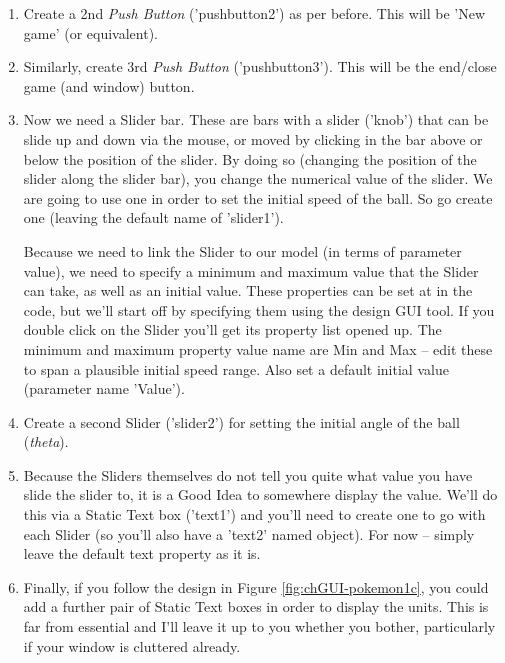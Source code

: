 \documentclass{tufte-book} %
\begin{document}
\begin{enumerate}
\item Create a 2nd \textit{Push Button} ('\textsf{pushbutton}2') as per before. This will be 'New game' (or equivalent).

\item Similarly, create 3rd \textit{Push Button} ('\textsf{pushbutton}3').
This will be the end/close game (and window) button.
\item Now we need a \textsf{Slider} bar. These are bars with a slider ('knob') that can be slide up and down via the mouse, or moved by clicking in the bar above or below the position of the slider. By doing so (changing the position of the slider along the slider bar), you change the numerical value of the slider. We are going to use one in order to set the initial speed of the ball. So go create one (leaving the default name of '\textsf{slider1}').

Because we need to link the \textsf{Slider} to our model (in terms of parameter value), we need to specify a minimum and maximum value that the \textsf{Slider} can take, as well as an initial value. These properties can be set at in the code, but we'll start off by specifying them using the design GUI tool. If you double click on the \textsf{Slider} you'll get its property list opened up. The minimum and maximum property value name are \textsf{Min} and \textsf{Max} -- edit these to span a plausible initial speed range. Also set a default initial value (parameter name '\textsf{Value}').

\item Create a second \textsf{Slider} ('\textsf{slider2}') for setting the initial angle of the ball (\textit{theta}).

\item Because the \textsf{Sliders} themselves do not tell you quite what value you have slide the slider to, it is a Good Idea to somewhere display the value. We'll do this via a \textsf{Static Text} box ('\textsf{text1}') and you'll need to create one to go with each \textsf{Slider} (so you'll also have a '\textsf{text2}' named object). For now -- simply leave the default text property as it is.

\item Finally, if you follow the design in Figure \ref{fig:chGUI-pokemon1c}, you could add a further pair of \textsf{Static Text} boxes in order to display the units. This is far from essential and I'll leave it up to you whether you bother, particularly if your window is cluttered already. 

\end{enumerate}
\end{document}
